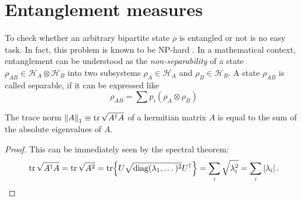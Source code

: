 \section{Entanglement measures}
To check whether an arbitrary bipartite state $\rho$ is entangled or not is no easy task. In fact, this problem is known to be NP-hard \cite{Gurvits_2003}.
In a mathematical context, entanglement can be understood as the \emph{non-separability} of a state $\rho_{AB} \in \mathcal{H}_A \otimes \mathcal{H}_B$ into two subsystems $\rho_A \in \mathcal{H}_A$ and $\rho_B \in \mathcal{H}_B$.
A state $\rho_{AB}$ is called separable, if it can be expressed like
\begin{equation}
  \rho_{AB} = \sum p_i (\rho_A \otimes \rho_B)
\end{equation}





\begin{lemma}\label{lemma:trace-norm-hermitian}
  The trace norm $\left\lVert A\right\rVert_1 \equiv \tr \sqrt{A^\dagger A}$ of a hermitian matrix $A$ is equal to the sum of the absolute eigenvalues of $A$.
\end{lemma}
\begin{proof}
  This can be immediately seen by the spectral theorem:
  \begin{equation*}
    \tr \sqrt{A^\dagger A} = \tr \sqrt{A^2} = \tr{U\sqrt{\operatorname{diag}(\lambda_1, \dots)^2}U^\dagger} = \sum_i \sqrt{\lambda_i^2} = \sum_i \left\lvert\lambda_i\right\rvert.
  \end{equation*}
\end{proof}

